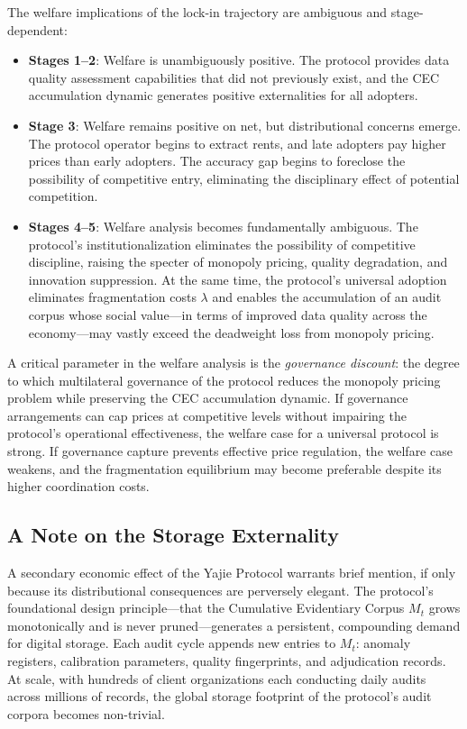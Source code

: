 \documentclass[12pt,a4paper]{article}
\theoremstyle{definition}
\theoremstyle{remark}
\begin{document}
The welfare implications of the lock-in trajectory are ambiguous and stage-dependent:
\begin{itemize}
\item \textbf{Stages 1–2}: Welfare is unambiguously positive. The protocol provides data quality assessment capabilities that did not previously exist, and the CEC accumulation dynamic generates positive externalities for all adopters.
\item \textbf{Stage 3}: Welfare remains positive on net, but distributional concerns emerge. The protocol operator begins to extract rents, and late adopters pay higher prices than early adopters. The accuracy gap begins to foreclose the possibility of competitive entry, eliminating the disciplinary effect of potential competition.
\item \textbf{Stages 4–5}: Welfare analysis becomes fundamentally ambiguous. The protocol's institutionalization eliminates the possibility of competitive discipline, raising the specter of monopoly pricing, quality degradation, and innovation suppression. At the same time, the protocol's universal adoption eliminates fragmentation costs $\lambda$ and enables the accumulation of an audit corpus whose social value—in terms of improved data quality across the economy—may vastly exceed the deadweight loss from monopoly pricing.
\end{itemize}

A critical parameter in the welfare analysis is the \textit{governance discount}: the degree to which multilateral governance of the protocol reduces the monopoly pricing problem while preserving the CEC accumulation dynamic. If governance arrangements can cap prices at competitive levels without impairing the protocol's operational effectiveness, the welfare case for a universal protocol is strong. If governance capture prevents effective price regulation, the welfare case weakens, and the fragmentation equilibrium may become preferable despite its higher coordination costs.

\subsection{A Note on the Storage Externality}

A secondary economic effect of the Yajie Protocol warrants brief mention, if only because its distributional consequences are perversely elegant. The protocol's foundational design principle—that the Cumulative Evidentiary Corpus $M_t$ grows monotonically and is never pruned—generates a persistent, compounding demand for digital storage. Each audit cycle appends new entries to $M_t$: anomaly registers, calibration parameters, quality fingerprints, and adjudication records. At scale, with hundreds of client organizations each conducting daily audits across millions of records, the global storage footprint of the protocol's audit corpora becomes non-trivial.
\end{document}
